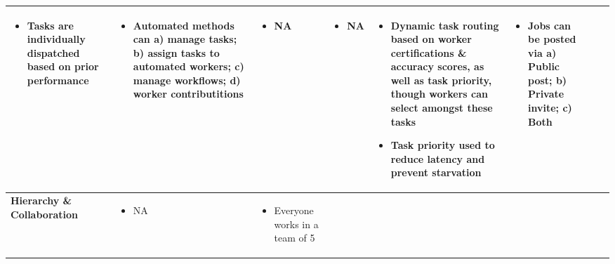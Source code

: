\documentclass{sigchi}
\begin{document}
\begin{sidewaystable*}
\begin{tabular}[h]{| p{1.5cm}| p{2.7cm}| p{2.7cm}| p{2.7cm}| p{2.7cm}| p{2.7cm}| p{2.7cm}| p{2.7cm}|}
{\begin{itemize} [noitemsep,nolistsep]
\item  Tasks are individually dispatched based on prior performance
\end{itemize}
} &
{
\begin{itemize} [noitemsep,nolistsep]
\item  Automated methods can a) manage tasks; b) assign tasks to automated workers; c) manage workflows; d) worker contributitions
\end{itemize}
} &
{
\begin{itemize} [noitemsep,nolistsep]
\item NA
\end{itemize}
} &
{
\begin{itemize} [noitemsep,nolistsep]
\item NA
\end{itemize}
} &
{
\begin{itemize} [noitemsep,nolistsep]
\item  Dynamic task routing based on worker certifications \& accuracy scores, as well as task priority, though workers can select amongst these tasks

\item  Task priority used to reduce latency and prevent starvation
\end{itemize}
} &
{
\begin{itemize} [noitemsep,nolistsep]
\item  Jobs can be posted via a) Public post; b) Private invite; c) Both
\end{itemize}
} \\ 
\hline


{\bf Hierarchy \& Collaboration
} & 
{
\begin{itemize} [noitemsep,nolistsep]
\item   NA
\end{itemize}
} &
{
\begin{itemize} [noitemsep,nolistsep]
\item  Everyone works in a team of 5


\end{itemize}}
\end{tabular}
\end{sidewaystable*}
\end{document}
